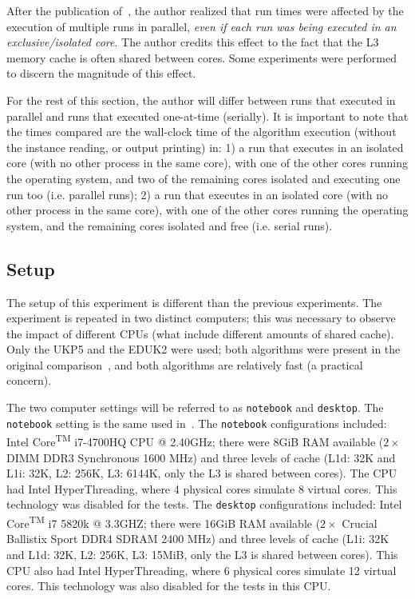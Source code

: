 After the publication of~\cite{sea2016}, the author realized that run times were affected by the execution of multiple runs in parallel, \emph{even if each run was being executed in an exclusive/isolated core}.
The author credits this effect to the fact that the L3 memory cache is often shared between cores.
Some experiments were performed to discern the magnitude of this effect.

For the rest of this section, the author will differ between runs that executed in parallel and runs that executed one-at-time (serially).
It is important to note that the times compared are the wall-clock time of the algorithm execution (without the instance reading, or output printing) in: 1) a run that executes in an isolated core (with no other process in the same core), with one of the other cores running the operating system, and two of the remaining cores isolated and executing one run too (i.e. parallel runs); 2) a run that executes in an isolated core (with no other process in the same core), with one of the other cores running the operating system, and the remaining cores isolated and free (i.e. serial runs).

\subsection{Setup}

The setup of this experiment is different than the previous experiments.
The experiment is repeated in two distinct computers;
this was necessary to observe the impact of different CPUs (what include different amounts of shared cache).
Only the UKP5 and the EDUK2 were used; both algorithms were present in the original comparison~\cite{sea2016}, and both algorithms are relatively fast (a practical concern). 

The two computer settings will be referred to as \verb+notebook+ and \verb+desktop+.
The \verb+notebook+ setting is the same used in~\cite{sea2016}.
The \verb+notebook+ configurations included: Intel\textsuperscript{\textregistered} Core\textsuperscript{TM} i7-4700HQ CPU @ 2.40GHz; there were 8GiB RAM available (\(2 \times\) DIMM DDR3 Synchronous 1600 MHz) and three levels of cache (L1d: 32K and L1i: 32K, L2: 256K, L3: 6144K, only the L3 is shared between cores).
The CPU had Intel\textsuperscript{\textregistered} HyperThreading, where 4 physical cores simulate 8 virtual cores.
This technology was disabled for the tests.
The \verb+desktop+ configurations included: Intel\textsuperscript{\textregistered} Core\textsuperscript{TM} i7 5820k @ 3.3GHZ; there were 16GiB RAM available (\(2 \times\) Crucial Ballistix Sport DDR4 SDRAM 2400 MHz) and three levels of cache (L1i: 32K and L1d: 32K, L2: 256K, L3: 15MiB, only the L3 is shared between cores).
This CPU also had Intel\textsuperscript{\textregistered} HyperThreading, where 6 physical cores simulate 12 virtual cores.
This technology was also disabled for the tests in this CPU.

